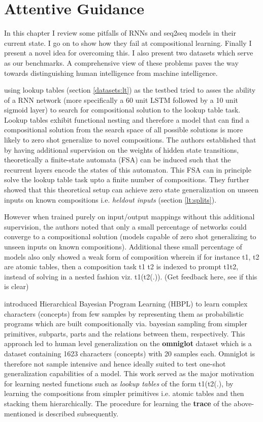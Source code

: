 \chapter{Attentive Guidance}\label{Chapter:proposals}

In this chapter I review some pitfalls of RNNs and seq2seq models in their current state. I go on to show how they fail at compositional learning. Finally I present a novel idea for overcoming this. I also present two datasets which serve as our benchmarks. A comprehensive view of these problems paves the way towards distinguishing human intelligence from machine intelligence. 

\cite{Liska2018} using lookup tables (section \ref{datasets:lt}) as the testbed tried to asses the ability of a RNN network (more specifically a 60 unit LSTM followed by a 10 unit sigmoid layer) to search for compositional solution to the lookup table task. Lookup tables exhibit functional nesting and therefore a model that can find a compositional solution from the search space of all possible solutions is more likely to zero shot generalize to novel compositions. The authors established that by having additional supervision on the weights of hidden state transitions, theoretically a finite-state automata (FSA) can be induced such that the recurrent layers encode the states of this automaton. This FSA can in principle solve the lookup table task upto a finite number of compositions. They further showed that this theoretical setup can achieve zero state generalization on unseen inputs on known compositions i.e. \textit{heldout inputs} (section \ref{lt:splits}).

However when trained purely on input/output mappings without this additional supervision, the authors noted that only a small percentage of networks could converge to a compositional solution (models capable of zero shot generalizing to unseen inputs on known compositions). Additional these small percentage of models also only showed a weak form of composition wherein if for instance t1, t2 are atomic tables, then a composition task t1 t2 is indexed to prompt t1t2, instead of solving in a nested fashion viz. t1(t2(.)). (Get feedback here, see if this is clear)

\cite{Lake2015} introduced Hierarchical Bayesian Program Learning (HBPL) to learn complex characters (concepts) from few samples by representing them as probabilistic programs which are built compositionally via. bayesian sampling from simpler primitives, subparts, parts and the relations between them, respectively. This approach led to human level generalization on the \textbf{omniglot} dataset \citep{Lake2015} which is a dataset containing 1623 characters (concepts) with 20 samples each. Omniglot is therefore not sample intensive and hence ideally suited to test one-shot generalization capabilities of a model. This work served as the major motivation for learning nested functions such as \textit{lookup tables} of the form t1(t2(.), by learning the compositions from simpler primitives i.e. atomic tables and then stacking them hierarchically. The procedure for learning the \textbf{trace} of the above-mentioned is described subsequently.

